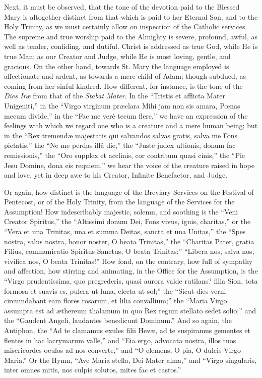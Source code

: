 Next, it must be observed, that the tone of the devotion paid to
the Blessed Mary is altogether distinct from that which is paid to her
Eternal Son, and to the Holy Trinity, as we must certainly allow on
inspection of the Catholic services. The supreme and true worship paid
to the Almighty is severe, profound, awful, as well as tender,
confiding, and dutiful. Christ is addressed as true God, while He is
true Man; as our Creator and Judge, while He is most loving, gentle,
and gracious. On the other hand, towards St. Mary the language
employed is affectionate and ardent, as towards a mere child of Adam;
though subdued, as coming from her sinful kindred. How different, for
instance, is the tone of the \emph{Dies Iræ} from that of the \emph{Stabat
Mater}. In the ``Tristis et afflicta Mater Unigeniti,'' in
the ``Virgo virginum præclara Mihi jam non sis amara, Pœnas
mecum divide,'' in the ``Fac me verè tecum flere,'' we
have an expression of the feelings with which we regard one who is a
creature and a mere human being; but in the ``Rex tremendæ
majestatis qui salvandos salvas gratis, salva me Fons pietatis,''
the ``Ne me perdas illâ die,'' the ``Juste judex ultionis,
donum fac remissionis,'' the ``Oro supplex et acclinis, cor
contritum quasi cinis,'' the ``Pie Jesu Domine, dona eis
requiem,'' we hear the voice of the creature raised in hope and
love, yet in deep awe to his Creator, Infinite Benefactor, and Judge.

Or again, how distinct is the language of the Breviary Services on
the Festival of Pentecost, or of the Holy Trinity, from the language
of the Services for the Assumption! How indescribably majestic,
solemn, and soothing is the ``Veni Creator Spiritus,'' the
``Altissimi donum Dei, Fons vivus, ignis, charitas,'' or the
``Vera et una Trinitas, una et summa Deitas, sancta et una Unitas,''
the ``Spes nostra, salus nostra, honor noster, O beata Trinitas,''
the ``Charitas Pater, gratia Filius, communicatio Spiritus
Sanctus, O beata Trinitas;'' ``Libera nos, salva nos, vivifica
nos, O beata Trinitas!'' How fond, on the contrary, how full of
sympathy and affection, how stirring and animating, in the Office for
the Assumption, is the ``Virgo prudentissima, quo pregrederis,
quasi aurora valde rutilans? filia Sion, tota formosa et suavis es,
pulcra ut luna, electa ut sol;'' the ``Sicut dies verni
circumdabant eam flores rosarum, et lilia convallium;'' the
``Maria Virgo assumpta est ad æthereum thalamum in quo Rex regum
stellato sedet solio;'' and the ``Gaudent Angeli, laudantes
benedicunt Dominum.'' And so again, the Antiphon, the ``Ad te
clamamus exules filii Hevæ, ad te suspiramus gementes et flentes in
hac lacrymarum valle,'' and ``Eia ergo, advocata nostra, illos
tuos misericordes oculos ad nos converte,'' and ``O clemens, O
pia, O dulcis Virgo Maria.'' Or the Hymn, ``Ave Maria stella,
Dei Mater alma,'' and ``Virgo singularis, inter omnes mitis,
nos culpis solutos, mites fac et castos.''

